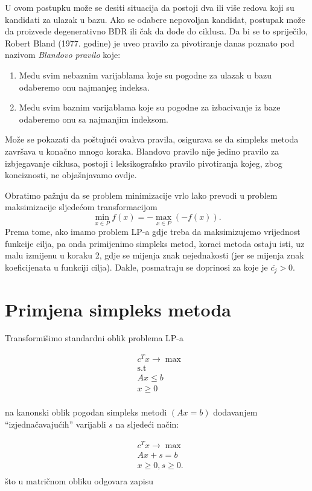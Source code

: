 \documentclass[a4paper, utf8, 11pt, colorlinks]{book}
\begin{document}
U ovom postupku  može se desiti situacija da postoji dva ili više redova koji su kandidati za ulazak u bazu. Ako se odabere nepovoljan kandidat, postupak može da proizvede degenerativno BDR ili čak da dođe do ciklusa. 
Da bi se to spriječilo, Robert Bland (1977. godine) je uveo pravilo za pivotiranje danas poznato pod
nazivom \emph{Blandovo pravilo} koje:
\begin{enumerate}
	\item   Među svim nebaznim varijablama koje su pogodne za ulazak u bazu odaberemo onu najmanjeg indeksa. 
    \item Među svim baznim varijablama koje su pogodne za izbacivanje iz baze odaberemo onu sa najmanjim indeksom.
\end{enumerate}
Može se pokazati da poštujući ovakva pravila, osigurava se da simpleks metoda  završava u konačno mnogo koraka. Blandovo pravilo nije jedino pravilo za izbjegavanje ciklusa, postoji i leksikografsko pravilo pivotiranja kojeg, zbog konciznosti, ne objašnjavamo ovdje.  

Obratimo pažnju da se problem minimizacije vrlo lako prevodi u problem maksimizacije sljedećom transformacijom
$$ \min_{ x \in P} f(x) = - \max_{x \in P}(-f(x)).$$ 
Prema tome, ako imamo problem LP-a gdje treba da maksimizujemo vrijednost funkcije cilja, pa onda primijenimo simpleks metod, koraci metoda ostaju isti, uz malu izmijenu u koraku 2, gdje se mijenja znak nejednakosti (jer se mijenja znak koeficijenata u funkciji cilja).  Dakle, posmatraju se doprinosi za koje je $\overline{c_j} > 0$.

\section{Primjena simpleks metoda}
Transformišimo standardni oblik problema LP-a
 
  \begin{align*}
    & c^T x \rightarrow \max \\
    & \mbox{s.t} \nonumber \\
    & Ax \leq b \\
    & x \geq 0\\
\end{align*}
 
na kanonski oblik pogodan simpleks metodi $(A {x} = b)$ dodavanjem ``izjednačavajućih'' varijabli $s$ na sljedeći način:
 
\begin{align}
    & c^T x \rightarrow \max \\
    & Ax + s =  b \\
    & x \geq 0, s \geq 0. \\
\end{align}
što u matričnom obliku odgovara zapisu
\end{document}
